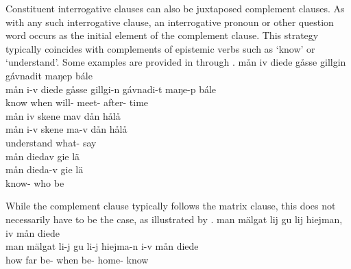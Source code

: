 Constituent interrogative clauses can also be juxtaposed complement clauses. As with any such interrogative clause, an interrogative pronoun or other question word occurs as the initial element of the complement clause. %
This strategy typically coincides with complements of epistemic verbs such as  ‘know’ or  ‘understand’. %
Some examples are provided in  through . 
\ea\label{Qsubordination1}
\glll	mån iv diede gåsse gillgin gávnadit maŋep bále\\
	mån i-v diede gåsse gillgi-n gávnadi-t maŋe-p bále\\
	  know\BS{} when will- meet- after- time\BS{}\\\nopagebreak
{} 
\z
\ea\label{Qsubordination2}
\glll	mån iv skene mav dån hålå\\
	mån i-v skene ma-v dån hålå\\
	  understand\BS{} what-  say\BS{}\\\nopagebreak
{} 
\z
\ea\label{Qsubordination3}
\glll	mån diedav gie lä\\
	mån dieda-v gie lä\\
	 know- who\BS{} be\BS{}\\\nopagebreak
{} 
\z

While the complement clause typically follows the matrix clause, this does not necessarily have to be the case, as illustrated by .%
\ea\label{Qsubordination4}
\glll	man mälgat lij gu lij hiejman, iv mån diede\\
	man mälgat li-j gu li-j hiejma-n i-v mån diede\\
	how far be- when be- home-   know\BS{}\\\nopagebreak
{} 
\z




